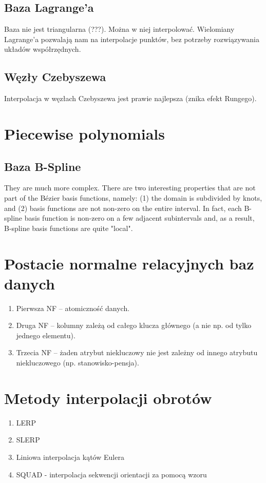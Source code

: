 \documentclass[12pt]{article}
\begin{document}
\subsection{Baza Lagrange'a}
Baza nie jest triangularna (???). Można w niej interpolować.
Wielomiany Lagrange'a pozwalają nam na interpolacje punktów, bez potrzeby rozwiązywania układów współrzędnych.
\subsection{Węzły Czebyszewa}
Interpolacja w węzłach Czebyszewa jest prawie najlepsza (znika efekt Rungego).

\section{Piecewise polynomials}
\subsection{Baza B-Spline}
They are much more complex. There are two interesting properties that are not part of the Bézier basis functions, namely: (1) the domain is subdivided by knots, and (2) basis functions are not non-zero on the entire interval. In fact, each B-spline basis function is non-zero on a few adjacent subintervals and, as a result, B-spline basis functions are quite "local".

\section{Postacie normalne relacyjnych baz danych}
\begin{enumerate}
	\item Pierwsza NF -- atomiczność danych.
	\item Druga NF -- kolumny zależą od całego klucza głównego (a nie np. od tylko jednego elementu).
	\item Trzecia NF -- żaden atrybut niekluczowy nie jest zależny od innego atrybutu niekluczowego (np. stanowisko-pensja).
\end{enumerate}

\setcounter{section}{22}
\section{Metody interpolacji obrotów}
\begin{enumerate}
	\item LERP
	\item SLERP
	\item Liniowa interpolacja kątów Eulera
	\item SQUAD - interpolacja sekwencji orientacji za pomocą wzoru
\end{enumerate}
\end{document}
